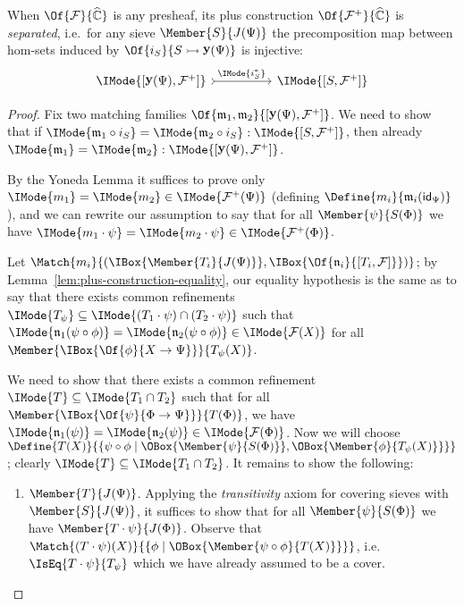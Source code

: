\documentclass{article}
\DeclareMathOperator\OpYoneda{\mathbf{y}}
\newcommand\Yoneda[1]{\OpYoneda({#1})}
\newcommand\Psh[1]{\widehat{#1}}
\newcommand\IsSubsetEq[2]{\IMode{#1}\subseteq\IMode{#2}}
\newcommand\ArrId[1]{\mathsf{id}_{#1}}
\newcommand\Plus[1]{{#1}^+}
\newcommand\MkSet[1]{\{#1\}}
\newcommand\IsEqOf[3]{\IMode{#1}=\IMode{#2}:\IMode{#3}}
\newcommand\IsEqIn[3]{\IMode{#1}=\IMode{#2}\in\IMode{#3}}
\begin{document}
\begin{thm}\label{thm:plus-separated}
  When $\Of{\mathcal{F}}{\Psh{\mathbb{C}}}$ is any presheaf, its plus
  construction $\Of{\Plus{\mathcal{F}}}{\Psh{\mathbb{C}}}$ is \emph{separated},
  i.e.\ for any sieve $\Member{S}{J(\Psi)}$ the precomposition map
  between hom-sets induced by
  $\Of{i_S}{S\rightarrowtail\Yoneda{\Psi}}$ is injective:
  \[
    \begin{tikzcd}[sep=huge]
      \IMode{[\Yoneda{\Psi},\Plus{\mathcal{F}}]}
      \arrow[r,tail,"\IMode{i_S^*}"]
      &
      \IMode{[S,\Plus{\mathcal{F}}]}
    \end{tikzcd}
  \]
\end{thm}
\begin{proof}
  Fix two matching families
  $\Of{\mathfrak{m}_1,\mathfrak{m}_2}{[\Yoneda{\Psi},\Plus{\mathcal{F}}]}$. We
  need to show that if
  $\IsEqOf{\mathfrak{m}_1\circ i_S}{\mathfrak{m}_2\circ
    i_S}{[S,\Plus{\mathcal{F}}]}$, then already
  $\IsEqOf{\mathfrak{m}_1}{\mathfrak{m}_2}{[\Yoneda{\Psi},\Plus{\mathcal{F}}]}$.
  
  By the Yoneda Lemma it suffices to prove only
  $\IsEqIn{m_1}{m_2}{\Plus{\mathcal{F}}(\Psi)}$ (defining
  $\Define{m_i}{\mathfrak{m}_i(\ArrId{\Psi})}$), and we can rewrite
  our assumption to say that for all $\Member{\psi}{S(\Phi)}$ we have
  $\IsEqIn{m_1\cdot\psi}{m_2\cdot\psi}{\Plus{\mathcal{F}}(\Phi)}$.

  Let
  $\Match{m_i}{(\IBox{\Member{T_i}{J(\Psi)}},\IBox{\Of{\mathfrak{n}_i}{[T_i,\mathcal{F}]}})}$;
  by Lemma~\ref{lem:plus-construction-equality}, our equality
  hypothesis is the same as to say that there exists common
  refinements $\IsSubsetEq{T_\psi}{(T_1\cdot\psi)\cap (T_2\cdot\psi)}$
  such that
  $\IsEqIn{\mathfrak{n}_1(\psi\circ\phi)}{\mathfrak{n}_2(\psi\circ\phi)}{\mathcal{F}(X)}$
  for all $\Member{\IBox{\Of{\phi}{X\to\Psi}}}{T_\psi(X)}$.

  We need to show that there exists a common refinement
  $\IsSubsetEq{T}{T_1\cap T_2}$ such that for all
  $\Member{\IBox{\Of{\psi}{\Phi\to\Psi}}}{T(\Phi)}$, we have
  $\IsEqIn{\mathfrak{n}_1(\psi)}{\mathfrak{n}_2(\psi)}{\mathcal{F}(\Phi)}$. Now
  we will choose
  $\Define{T(X)}{\MkSet{\psi \circ \phi \mid
      \OBox{\Member{\psi}{S(\Phi)}}, \OBox{\Member{\phi}{T_\psi(X)}}}}$;
  clearly $\IsSubsetEq{T}{T_1\cap T_2}$. It remains to show the
  following:
  \begin{enumerate}
  \item $\Member{T}{J(\Psi)}$. Applying the \emph{transitivity} axiom
    for covering sieves with $\Member{S}{J(\Psi)}$, it suffices to
    show that for all $\Member{\psi}{S(\Phi)}$ we have
    $\Member{T\cdot\psi}{J(\Phi)}$. Observe that
    $\Match{(T\cdot\psi)(X)}{\MkSet{\phi\mid
        \OBox{\Member{\psi\circ\phi}{T(X)}}}}$, i.e.\
    $\IsEq{T\cdot\psi}{T_\psi}$ which we have already assumed to be a
    cover.


\end{enumerate}
\end{proof}
\end{document}
